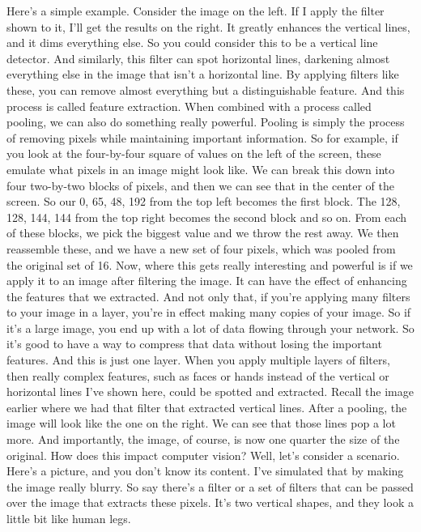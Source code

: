 Here's a simple example.
Consider the image on the left.
If I apply the filter shown to it, I'll get the results on the right.
It greatly enhances the vertical lines, and it dims everything else.
So you could consider this to be a vertical line detector.
And similarly, this filter can spot horizontal lines,
darkening almost everything else in the image that isn't a horizontal line.
By applying filters like these, you can remove almost everything
but a distinguishable feature.
And this process is called feature extraction.
When combined with a process called pooling,
we can also do something really powerful.
Pooling is simply the process of removing pixels
while maintaining important information.
So for example, if you look at the four-by-four square of values
on the left of the screen, these emulate what pixels in an image
might look like.
We can break this down into four two-by-two blocks of pixels,
and then we can see that in the center of the screen.
So our 0, 65, 48, 192 from the top left becomes the first block.
The 128, 128, 144, 144 from the top right
becomes the second block and so on.
From each of these blocks, we pick the biggest value
and we throw the rest away.
We then reassemble these, and we have a new set of four pixels, which
was pooled from the original set of 16.
Now, where this gets really interesting and powerful
is if we apply it to an image after filtering the image.
It can have the effect of enhancing the features that we extracted.
And not only that, if you're applying many filters to your image in a layer,
you're in effect making many copies of your image.
So if it's a large image, you end up with a lot
of data flowing through your network.
So it's good to have a way to compress that data without losing
the important features.
And this is just one layer.
When you apply multiple layers of filters,
then really complex features, such as faces or hands
instead of the vertical or horizontal lines I've shown here,
could be spotted and extracted.
Recall the image earlier where we had that filter that
extracted vertical lines.
After a pooling, the image will look like the one on the right.
We can see that those lines pop a lot more.
And importantly, the image, of course, is now one quarter
the size of the original.
How does this impact computer vision?
Well, let's consider a scenario.
Here's a picture, and you don't know its content.
I've simulated that by making the image really blurry.
So say there's a filter or a set of filters
that can be passed over the image that extracts these pixels.
It's two vertical shapes, and they look a little bit like human legs.

